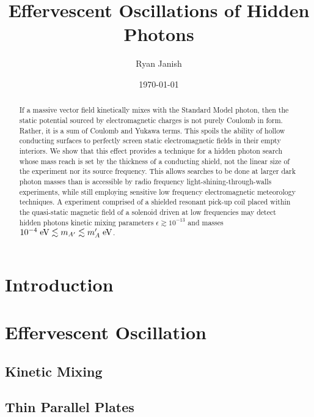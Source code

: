 \documentclass[prd,longbibliography,nofootinbib]{revtex4-2}
\begin{document}

\title{Effervescent Oscillations of Hidden Photons}
\author{Ryan Janish}
\date{\today}

\begin{abstract}
If a massive vector field kinetically mixes with the Standard Model photon, then the static potential sourced by electromagnetic charges is not purely Coulomb in form. 
Rather, it is a sum of Coulomb and Yukawa terms. 
This spoils the ability of hollow conducting surfaces to perfectly screen static electromagnetic fields in their empty interiors. 
We show that this effect provides a technique for a hidden photon search whose mass reach is set by the thickness of a conducting shield, not the linear size of the experiment nor its source frequency. 
This allows searches to be done at larger dark photon masses than is accessible by radio frequency light-shining-through-walls experiments, while still employing sensitive low frequency electromagnetic meteorology techniques. 
A experiment comprised of a shielded resonant pick-up coil placed within the quasi-static magnetic field of a solenoid driven at low frequencies may detect hidden photons kinetic mixing parameters $\epsilon \gtrsim 10^{-13}$ and masses $10^{-4} \;\textnormal{eV} \lesssim m_{A'} \lesssim m_A' \;\textnormal{eV}$. 


\end{abstract}

\maketitle


\section{Introduction}

\section{Effervescent Oscillation}

\subsection{Kinetic Mixing}

\subsection{Thin Parallel Plates}
\end{document}

